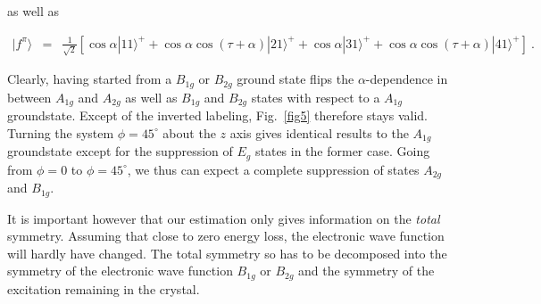 \documentclass[twocolumn,prb,twocolumn,amsmath,superscriptaddress,nofootinbib,amssymb]{revtex4-1}
\begin{document}
\begin{widetext}
\noindent as well as

\begin{eqnarray}
|f^\pi\rangle&=&\frac{1}{\sqrt{2}}\left[\cos\alpha |11\rangle^++\cos\alpha\cos(\tau+\alpha) |21\rangle^+ + \cos\alpha |31\rangle^+ +\cos\alpha\cos(\tau+\alpha) |41\rangle^+\right]~.\nonumber
\end{eqnarray}

\begin{table*}[htbp]
\caption{\label{tab: mode spectral weight b2g} Spectral weight of the final states as a function of scattering angle $\tau$ and the incoming light direction $\alpha$ starting from a $B_{1g}$ or $B_{2g}$ groundstate.}
\end{table*}


Clearly, having started from a $B_{1g}$ or $B_{2g}$ ground state flips the $\alpha$-dependence in between $A_{1g}$ and $A_{2g}$ as well as $B_{1g}$ and $B_{2g}$ states with respect to a $A_{1g}$ groundstate. Except of the inverted labeling, Fig.~\ref{fig5} therefore stays valid. Turning the system $\phi=45^{\circ}$ about the $z$ axis gives identical results to the $A_{1g}$ groundstate except for the suppression of $E_g$ states in the former case. Going from $\phi=0$ to $\phi=45^{\circ}$, we thus can expect a complete suppression of states $A_{2g}$ and $B_{1g}$.

It is important however that our estimation only gives information on the \textit{total} symmetry. Assuming that close to zero energy loss, the electronic wave function will hardly have changed. The total symmetry so has to be decomposed into the symmetry of the electronic wave function $B_{1g}$ or $B_{2g}$ and the symmetry of the excitation remaining in the crystal.


\end{widetext}
\end{document}
